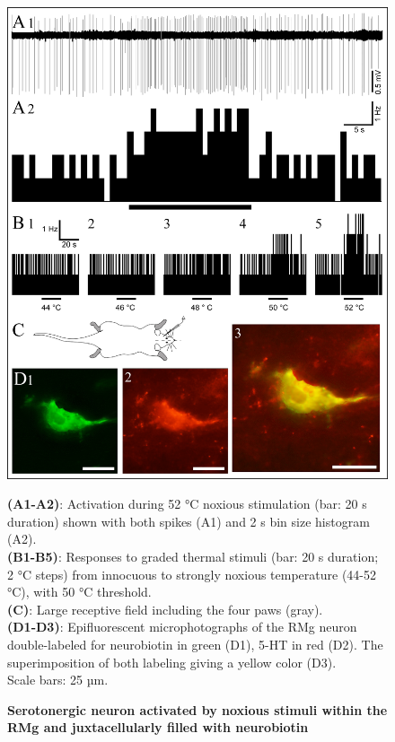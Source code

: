 \documentclass[a4paper,12pt,twoside]{report}
\begin{document}
\begin{figure}[p]

\begin{center}
 \includegraphics[scale=0.9]{Article3-FIG3.jpg} 
\end{center}

\caption[RMg 5-HT neuron activated by noxious stimuli]{\textbf{Serotonergic neuron activated by noxious stimuli within the RMg and juxtacellularly filled with neurobiotin}}

{\protect\parbox[t]{18cm}{
\begin{small}
\textbf{(A1-A2)}: Activation during 52 °C noxious stimulation (bar: 20 s duration) shown with both spikes (A1) and 2 s bin size histogram (A2).\\
\textbf{(B1-B5)}: Responses to graded thermal stimuli (bar: 20 s duration; 2 °C steps) from innocuous to strongly noxious temperature (44-52 °C), with 50 °C threshold.\\
\textbf{(C)}: Large receptive field including the four paws (gray).\\ 
\textbf{(D1-D3)}: Epifluorescent microphotographs of the RMg neuron double-labeled for neurobiotin in green (D1), 5-HT in red (D2). The superimposition of both labeling giving a yellow color (D3). \\
Scale bars: 25 µm.
\end{small}}}

\label{Article3-FIG3}

\end{figure}
\end{document}
